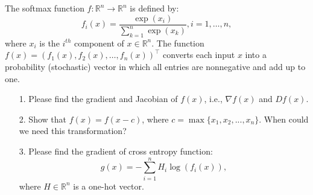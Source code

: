\documentclass[11pt,letter,notitlepage]{article}
\begin{document}
\begin{exercise}
	The softmax function $f:\mathbb{R}^n\rightarrow\mathbb{R}^n$ is defined by:
	$$f_i(x)=\frac{\exp(x_i)}{\sum_{k=1}^{n}\exp(x_k)}, i=1,\ldots,n,$$
	where $x_i$ is the $i^{th}$ component of $x\in\mathbb{R}^n$. The function  $f(x)=(f_1(x),f_2(x),\ldots,f_n(x))^{\top}$ converts each input $x$ into a probability (stochastic) vector in which all entries are nonnegative and add up to one.
	\begin{itemize}
		\item[1.] Please find the gradient and Jacobian of $f(x)$, i.e., $\nabla f(x)$ and $Df(x)$. 
		
		\item[2.] Show that $f(x)=f(x-c)$, where $c=\max\{x_1,x_2,...,x_n\}$. When could we need this transformation?
		
		\item[3.] Please find the gradient of cross entropy function:
		$$g(x)=-\sum_{i=1}^{n}H_i\log(f_i(x)),$$
		where $H\in\mathbb{R}^n$ is a one-hot vector.
	\end{itemize}
\end{exercise}

\begin{solution}

\end{solution}

\newpage
\end{document}
